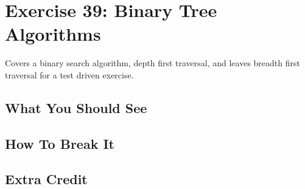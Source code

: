 \chapter{Exercise 39: Binary Tree Algorithms}

Covers a binary search algorithm, depth first traversal, and leaves breadth first traversal for a test driven exercise.


\section{What You Should See}


\section{How To Break It}


\section{Extra Credit}




